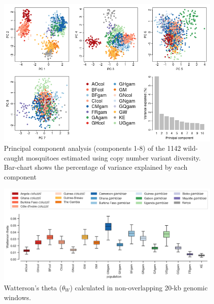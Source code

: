 \documentclass[a4paper,11pt,abstracton,hidelinks]{scrartcl}
\begin{document}
\clearpage

\begin{figure}[H]
	\begin{center}
		\includegraphics*[width=6.3in]{notebooks/190-CNV-PCAs/PCA_nonsingle_full.png}
	\end{center}
	\caption{Principal component analysis (components 1-8) of the 1142 wild-caught mosquitoes estimated using copy number variant diversity. Bar-chart shows the percentage of variance explained by each component}
	\label{fig:cnv_pca}
\end{figure}


\clearpage

\begin{figure}[H]
	\begin{center}
		\includegraphics*[width=6.3in]{artwork/Watterson_theta.jpeg}
	\end{center}
	\caption{Watterson's theta ($\theta_{W}$) calculated in non-overlapping 20-kb genomic windows.}
	\label{fig:theta_w}
\end{figure}
\end{document}
